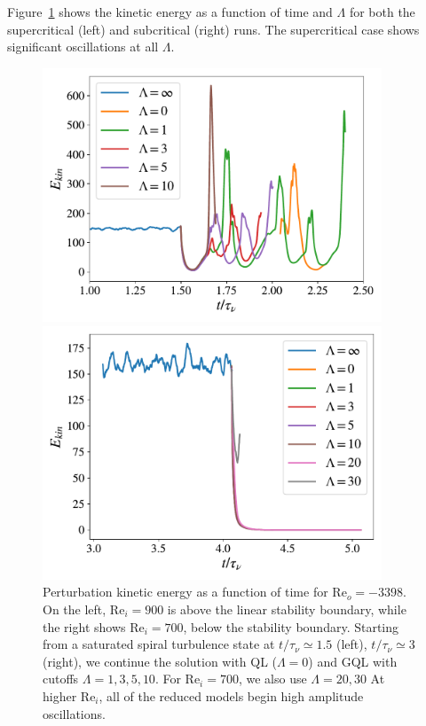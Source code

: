 \documentclass[openacc]{rstransa}%
\newcommand{\Reyn}{\mathrm{Re}}
\begin{document}
Figure~\ref{fig:ke_vs_t_rei900} shows the kinetic energy as a function of time and $\Lambda$ for both the supercritical (left) and subcritical (right) runs. 
The supercritical case shows significant oscillations at all $\Lambda$. 
\begin{figure}
    \centering
    \begin{minipage}{0.45\textwidth}
        \centering
        \includegraphics[width=0.9\textwidth]{figs/rei900_reo_-3398_KE_vs_t.pdf}
    \end{minipage}
    \begin{minipage}{0.45\textwidth}
        \centering
        \includegraphics[width=0.9\textwidth]{figs/rei700_reo_-3398_KE_vs_t.pdf}
    \end{minipage}
    \caption{Perturbation kinetic energy as a function of time for $\Reyn_o=-3398$. On the left,  $\Reyn_i = 900$ is above the linear stability boundary, while the right shows $\Reyn_i = 700$, below the stability boundary. Starting from a saturated spiral turbulence state at $t/\tau_\nu \simeq 1.5$ (left), $t/\tau_\nu \simeq 3$ (right), we continue the solution with QL ($\Lambda = 0$) and GQL with cutoffs $\Lambda = 1,3,5,10$. For $\Reyn_i = 700$, we also use $\Lambda = 20, 30$ At higher $\Reyn_i$, all of the reduced models begin high amplitude oscillations. }
    \label{fig:ke_vs_t_rei900}
\end{figure}
\end{document}
